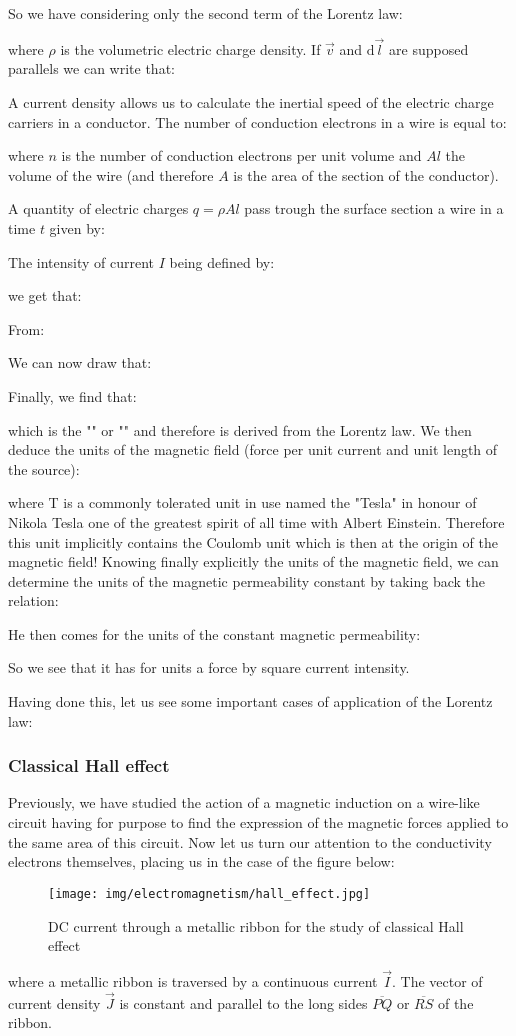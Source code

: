 	So we have considering only the second term of the Lorentz law:
	
	where $\rho$ is the volumetric electric charge density. If $\vec{v}$ and $\mathrm{d}\vec{l}$ are supposed parallels we can write that:
	
	A current density allows us to calculate the inertial speed of the electric charge carriers in a conductor. The number of conduction electrons in a wire is equal to:
	
	where $n$ is the number of conduction electrons per unit volume and $Al$ the volume of the wire (and therefore $A$ is the area of the section of the conductor).
	
	A quantity of electric charges $q=\rho A l$ pass trough the surface section a wire in a time $t$ given by:
	
	The intensity of current $I$ being defined by:
	
	we get that:
	
	From:
	
	We can now draw that:
	
	Finally, we find that:
	
	which is the "\label{Laplace law}" or "" and therefore is derived from the Lorentz law. We then deduce the units of the magnetic field (force per unit current and unit length of the source):
	
	where T is a commonly tolerated unit in use named the "Tesla" in honour of Nikola Tesla one of the greatest spirit of all time with Albert Einstein. Therefore this unit implicitly contains the Coulomb unit which is then at the origin of the magnetic field! Knowing finally explicitly the units of the magnetic field, we can determine the units of the magnetic permeability constant by taking back the relation:
	
	He then comes for the units of the constant magnetic permeability:
	
	So we see that it has for units a force by square current intensity.

	Having done this, let us see some important cases of application of the Lorentz law:
	
	\pagebreak
	\subsubsection{Classical Hall effect}
	Previously, we have studied the action of a magnetic induction on a wire-like circuit having for purpose to find the expression of the magnetic forces applied to the same area of this circuit. Now let us turn our attention to the conductivity electrons themselves, placing us in the case of the figure below:
	\begin{figure}[H]
		\centering
		\texttt{[image: img/electromagnetism/hall\_effect.jpg]}
		\caption{DC current through a metallic ribbon for the study of classical Hall effect}
	\end{figure}
	where a metallic ribbon is traversed by a continuous current $\vec{I}$. The vector of current density $\vec{J}$ is constant and parallel to the long sides $\overline{PQ}$ or $\overline{RS}$ of the ribbon.
	
